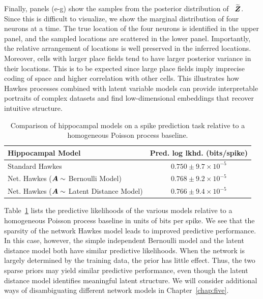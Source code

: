 Finally, panels (e-g) show the samples from the posterior distribution
of ~$\widetilde{\boldsymbol{Z}}$. Since this is difficult to visualize, we show
the marginal distribution of four neurons at a time. The true location
of the four neurons is identified in the upper panel, and the sampled
locations are scattered in the lower panel. Importantly, the relative
arrangement of locations is well preserved in the inferred locations.
Moreover, cells with larger place fields tend to have larger posterior
variance in their locations. This is to be expected since large place
fields imply imprecise coding of space and higher correlation with
other cells.  This illustrates how Hawkes processes combined with
latent variable models can provide interpretable portraits of complex
datasets and find low-dimensional embeddings that recover intuitive
structure.

\begin{table}
  \begin{center}
    \begin{tabular}{l|c}
      \textbf{Hippocampal Model} & \textbf{Pred. log lkhd. (bits/spike)} \\
      \hline
      Standard Hawkes & $0.750 \pm 9.7 \times 10^{-5}$ \\
      Net. Hawkes ($\boldsymbol{A} \sim $ Bernoulli Model) & $0.768 \pm 9.2 \times 10^{-5}$ \\
      Net. Hawkes ($\boldsymbol{A} \sim $ Latent Distance Model) & $0.766 \pm 9.4\times 10^{-5}$ \\
    \end{tabular}
  \end{center}
    \caption{Comparison of hippocampal models on a spike prediction task relative to a homogeneous Poisson process baseline.}
    \label{tab:hipp_pred_ll}
\end{table}

Table~\ref{tab:hipp_pred_ll} lists the predictive likelihoods of the
various models relative to a homogeneous Poisson process baseline in
units of bits per spike. We see that the sparsity of the network Hawkes
model leads to improved predictive performance. In this case, however,
the simple independent Bernoulli model and the latent distance model
both have similar predictive likelihoods. When the network is largely
determined by the training data, the prior has little effect. Thus,
the two sparse priors may yield similar predictive performance, even though
the latent distance model identifies meaningful latent structure.
We will consider additional ways of disambiguating different network
models in Chapter~\ref{chap:five}.


